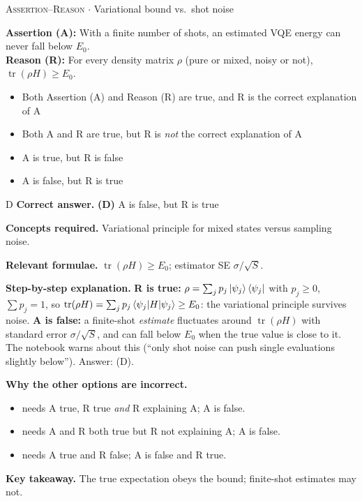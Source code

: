 \documentclass[11pt,a4paper]{article}
\newcommand{\optlabel}[1]{\textbf{(#1)}}
\newcommand{\correctlabel}[1]{\textcolor{okgreen}{\textbf{(#1)}\,\ding{51}}}
\newenvironment{qitem}[1]{\begin{list}{}{\setlength{\leftmargin}{3.3em}\setlength{\labelwidth}{3.1em}%
  \setlength{\labelsep}{0.2em}\setlength{\topsep}{3pt}\setlength{\parsep}{3pt}}\item[\textbf{Q.#1}\hfill]}{\end{list}}
\newcommand{\qsep}{\par\vspace{2pt}{\color{black!15}\hrule}\vspace{4pt}}
\newcommand{\qmeta}[2]{{\footnotesize\color{black!60}\textsc{#1} \;$\cdot$\; #2}\par}
\begin{document}
\begin{qitem}{71}
\qmeta{Assertion--Reason}{Variational bound vs.\ shot noise}
\textbf{Assertion (A):} With a finite number of shots, an estimated VQE energy can never fall below $E_0$.\\[1mm]
\textbf{Reason (R):} For every density matrix $\rho$ (pure or mixed, noisy or not), $\operatorname{tr}(\rho H) \ge E_0$.
\begin{itemize}[leftmargin=2.6em, labelsep=0.4em, itemsep=2pt, topsep=3pt]
\item[\optlabel{A}] Both Assertion (A) and Reason (R) are true, and R is the correct explanation of A
\item[\optlabel{B}] Both A and R are true, but R is \emph{not} the correct explanation of A
\item[\optlabel{C}] A is true, but R is false
\item[\correctlabel{D}] A is false, but R is true
\end{itemize}
\end{qitem}
\begin{solbox}{D}
\textbf{\color{brand}Correct answer.} \textcolor{okgreen}{\textbf{(D)}} A is false, but R is true

\textbf{\color{brand}Concepts required.} Variational principle for mixed states versus sampling noise.

\textbf{\color{brand}Relevant formulae.} $\operatorname{tr}(\rho H) \ge E_0$; estimator SE $\sigma/\sqrt S$.

\textbf{\color{brand}Step-by-step explanation.} \textbf{R is true:} $\rho = \sum_jp_j\ket{\psi_j}\bra{\psi_j}$ with $p_j \ge 0$, $\sum p_j = 1$, so $\operatorname{tr}(\rho H) = \sum_jp_j\braket{\psi_j|H|\psi_j} \ge E_0$: the variational principle survives noise.
\textbf{A is false:} a finite-shot \emph{estimate} fluctuates around $\operatorname{tr}(\rho H)$ with standard error $\sigma/\sqrt S$, and can fall below $E_0$ when the true value is
close to it. The notebook warns about this (``only shot noise can push single evaluations slightly below''). Answer: (D).

\textbf{\color{brand}Why the other options are incorrect.}
\begin{itemize}[leftmargin=2.4em, itemsep=1pt, topsep=2pt]
\item[\textbf{(A)}] needs A true, R true \emph{and} R explaining A; A is false.
\item[\textbf{(B)}] needs A and R both true but R not explaining A; A is false.
\item[\textbf{(C)}] needs A true and R false; A is false and R true.
\end{itemize}
\textbf{\color{brand}Key takeaway.} The true expectation obeys the bound; finite-shot estimates may not.
\end{solbox}
\qsep
\end{document}
